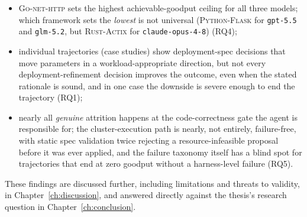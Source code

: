 \begin{itemize}
        fifth of the cost; within a task, code refinement costs two to
        three times a deployment refinement and total spend is close to
        linear in the iteration budget
        (RQ1; Section~\ref{sec:results-cost});
  \item \textsc{Go-net-http} sets the highest achievable-goodput ceiling
        for all three models; which framework sets the \emph{lowest} is
        not universal (\textsc{Python-Flask} for \texttt{gpt-5.5} and
        \texttt{glm-5.2}, but \textsc{Rust-Actix} for
        \texttt{claude-opus-4-8}) (RQ4);
  \item individual trajectories (case studies) show deployment-spec
        decisions that move parameters in a workload-appropriate
        direction, but not every deployment-refinement decision improves the
        outcome, even when the stated rationale is sound, and in one case
        the downside is severe enough to end the trajectory (RQ1);
  \item nearly all \emph{genuine} attrition happens at the
        code-correctness gate the agent is responsible for; the
        cluster-execution path is nearly, not entirely, failure-free, with
        static spec validation twice rejecting a resource-infeasible
        proposal before it was ever applied, and the failure taxonomy
        itself has a blind spot for trajectories that end at zero goodput
        without a harness-level failure (RQ5).
\end{itemize}

These findings are discussed further, including limitations and threats
to validity, in Chapter~\ref{ch:discussion}, and answered directly against
the thesis's research question in Chapter~\ref{ch:conclusion}.
